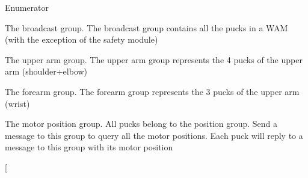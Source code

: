 \begin{Desc}
\item[Enumerator]\par
\begin{description}
\item[{\em 
\hypertarget{classosa_group_a642da327f9e3c40d46293432b949f199ae9534ab59a1ea39b9cee0501a8cd004c}{}B\+R\+O\+A\+D\+C\+A\+S\+T\label{classosa_group_a642da327f9e3c40d46293432b949f199ae9534ab59a1ea39b9cee0501a8cd004c}
}]The broadcast group. The broadcast group contains all the pucks in a W\+A\+M (with the exception of the safety module) \item[{\em 
\hypertarget{classosa_group_a642da327f9e3c40d46293432b949f199a20d3ec176caaf6065d5e80a30b3a2d65}{}U\+P\+P\+E\+R\+A\+R\+M\label{classosa_group_a642da327f9e3c40d46293432b949f199a20d3ec176caaf6065d5e80a30b3a2d65}
}]The upper arm group. The upper arm group represents the 4 pucks of the upper arm (shoulder+elbow) \item[{\em 
\hypertarget{classosa_group_a642da327f9e3c40d46293432b949f199a18cea4e0d67419684d28db8281ba6877}{}F\+O\+R\+E\+A\+R\+M\label{classosa_group_a642da327f9e3c40d46293432b949f199a18cea4e0d67419684d28db8281ba6877}
}]The forearm group. The forearm group represents the 3 pucks of the upper arm (wrist) \item[{\em 
\hypertarget{classosa_group_a642da327f9e3c40d46293432b949f199a99ec87c699a923e3bdd6f4e4b230e22b}{}P\+O\+S\+I\+T\+I\+O\+N\label{classosa_group_a642da327f9e3c40d46293432b949f199a99ec87c699a923e3bdd6f4e4b230e22b}
}]The motor position group. All pucks belong to the position group. Send a message to this group to query all the motor positions. Each puck will reply to a message to this group with its motor position \item[{\em 
}
\end{description}
\end{Desc}
